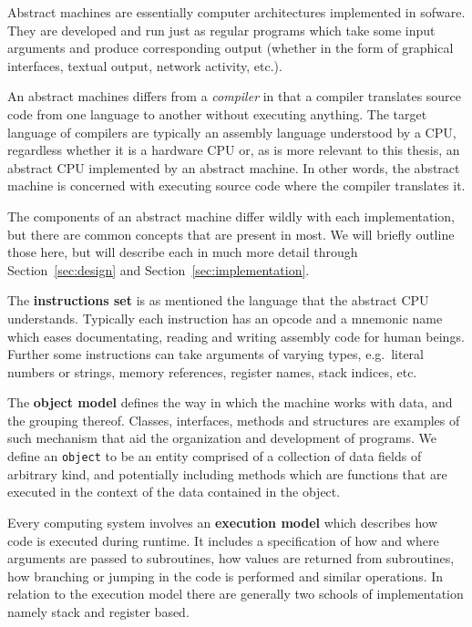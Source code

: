 Abstract machines are essentially computer architectures implemented in
sofware. They are developed and run just as regular programs which take some
input arguments and produce corresponding output (whether in the form of
graphical interfaces, textual output, network activity, etc.).

An abstract machines differs from a \textit{compiler} in that a compiler
translates source code from one language to another without executing
anything. The target language of compilers are typically an assembly language
understood by a CPU, regardless whether it is a hardware CPU or, as is more
relevant to this thesis, an abstract CPU implemented by an abstract machine. In
other words, the abstract machine is concerned with executing source code where
the compiler translates it.

The components of an abstract machine differ wildly with each implementation,
but there are common concepts that are present in most. We will briefly outline
those here, but will describe each in much more detail through
Section~\ref{sec:design} and Section~\ref{sec:implementation}.

The \textbf{instructions set} is as mentioned the language that the abstract CPU
understands. Typically each instruction has an opcode and a mnemonic name which
eases documentating, reading and writing assembly code for human beings. Further
some instructions can take arguments of varying types, e.g.~literal numbers or
strings, memory references, register names, stack indices, etc.

The \textbf{object model} defines the way in which the machine works with data,
and the grouping thereof. Classes, interfaces, methods and structures are
examples of such mechanism that aid the organization and development of
programs. We define an \texttt{object} to be an entity comprised of a collection
of data fields of arbitrary kind, and potentially including methods which are
functions that are executed in the context of the data contained in the object.

Every computing system involves an \textbf{execution model} which describes how
code is executed during runtime. It includes a specification of how and where
arguments are passed to subroutines, how values are returned from subroutines,
how branching or jumping in the code is performed and similar operations. In
relation to the execution model there are generally two schools of
implementation namely stack and register based.%




